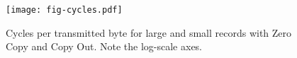 \begin{figure}[t]
\texttt{[image: fig-cycles.pdf]}
\caption{Cycles per transmitted byte for large and small records with Zero Copy and Copy Out. Note the log-scale axes.}
\label{fig:cycles}
\end{figure}
